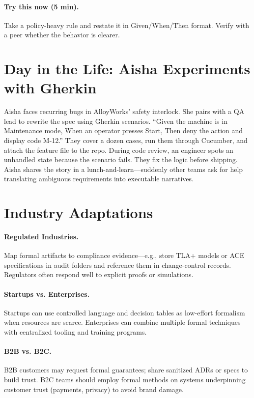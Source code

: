 \paragraph{Try this now (5 min).} Take a policy-heavy rule and restate it in Given/When/Then format. Verify with a peer whether the behavior is clearer.

\section{Day in the Life: Aisha Experiments with Gherkin}
Aisha faces recurring bugs in AlloyWorks' safety interlock. She pairs with a QA lead to rewrite the spec using Gherkin scenarios. ``Given the machine is in Maintenance mode, When an operator presses Start, Then deny the action and display code M-12.'' They cover a dozen cases, run them through Cucumber, and attach the feature file to the repo. During code review, an engineer spots an unhandled state because the scenario fails. They fix the logic before shipping. Aisha shares the story in a lunch-and-learn—suddenly other teams ask for help translating ambiguous requirements into executable narratives.
\section{Industry Adaptations}
\label{sec:formal-industry}
\paragraph{Regulated Industries.} Map formal artifacts to compliance evidence—e.g., store TLA+ models or ACE specifications in audit folders and reference them in change-control records. Regulators often respond well to explicit proofs or simulations.

\paragraph{Startups vs. Enterprises.} Startups can use controlled language and decision tables as low-effort formalism when resources are scarce. Enterprises can combine multiple formal techniques with centralized tooling and training programs.

\paragraph{B2B vs. B2C.} B2B customers may request formal guarantees; share sanitized ADRs or specs to build trust. B2C teams should employ formal methods on systems underpinning customer trust (payments, privacy) to avoid brand damage.

